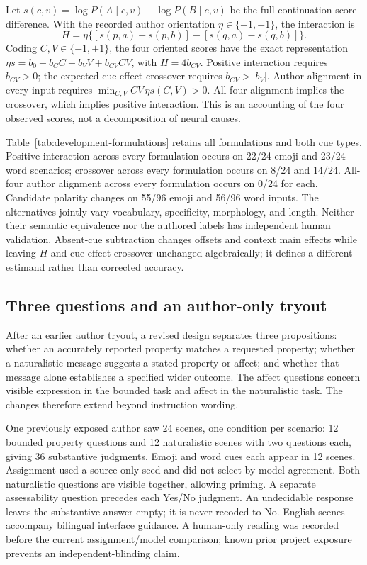 Let $s(c,v)=\log P(A\mid c,v)-\log P(B\mid c,v)$ be the full-continuation
score difference. With the recorded author orientation $\eta\in\{-1,+1\}$,
the interaction is
\[
H=\eta\{[s(p,a)-s(p,b)]-[s(q,a)-s(q,b)]\}.
\]
Coding $C,V\in\{-1,+1\}$, the four oriented scores have the exact
representation $\eta s=b_0+b_C C+b_V V+b_{CV}CV$, with $H=4b_{CV}$.
Positive interaction requires $b_{CV}>0$; the expected cue-effect crossover
requires $b_{CV}>|b_V|$. Author alignment in every input requires
$\min_{C,V} CV\,\eta s(C,V)>0$. All-four alignment implies the crossover,
which implies positive interaction. This is an accounting of the four
observed scores, not a decomposition of neural causes.

Table~\ref{tab:development-formulations} retains all formulations and both
cue types. Positive interaction across every formulation occurs on 22/24
emoji and 23/24 word scenarios; crossover across every formulation occurs on
8/24 and 14/24. All-four author alignment across every formulation occurs on
0/24 for each. Candidate polarity changes on 55/96 emoji and 56/96 word inputs.
The alternatives jointly vary vocabulary, specificity, morphology, and length.
Neither their semantic equivalence nor the authored labels has independent
human validation. Absent-cue subtraction changes offsets and context main
effects while leaving $H$ and cue-effect crossover unchanged algebraically;
it defines a different estimand rather than corrected accuracy.

\subsection{Three questions and an author-only tryout}

After an earlier author tryout, a revised design separates three propositions:
whether an accurately reported property matches a requested property;
whether a naturalistic message suggests a stated property or affect; and
whether that message alone establishes a specified wider outcome. The affect
questions concern visible expression in the bounded task and affect in the
naturalistic task. The changes therefore extend beyond instruction wording.

One previously exposed author saw 24 scenes, one condition per scenario:
12 bounded property questions and 12 naturalistic scenes with two questions
each, giving 36 substantive judgments. Emoji and word cues each appear in
12 scenes. Assignment used a source-only seed and did not select by model
agreement. Both naturalistic questions are visible together, allowing priming.
A separate assessability question precedes each Yes/No judgment. An undecidable
response leaves the substantive answer empty; it is never recoded to No.
English scenes accompany bilingual interface guidance. A human-only reading
was recorded before the current assignment/model comparison; known prior
project exposure prevents an independent-blinding claim.

